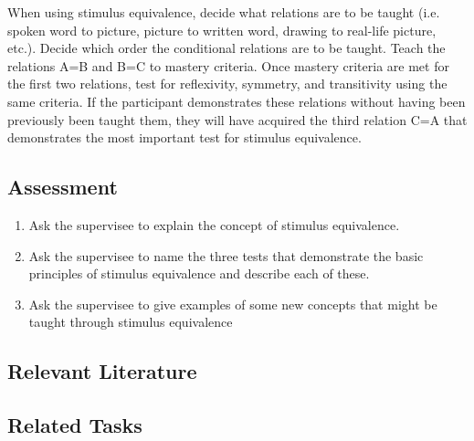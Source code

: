 When using stimulus equivalence, decide what relations are to be taught (i.e. spoken word to picture, picture to written word, drawing to real-life picture, etc.).  Decide which order the conditional relations are to be taught.  Teach the relations A=B and B=C to mastery criteria.  Once mastery criteria are met for the first two relations, test for reflexivity, symmetry, and transitivity using the same criteria.  If the participant demonstrates these relations without having been previously been taught them, they will have acquired the third relation C=A that demonstrates the most important test for stimulus equivalence.   

\subsection{Assessment}
\begin{enumerate}
\item Ask the supervisee to explain the concept of stimulus equivalence.
\item Ask the supervisee to name the three tests that demonstrate the basic principles of stimulus equivalence and describe each of these.
\item Ask the supervisee to give examples of some new concepts that might be taught through stimulus equivalence
\end{enumerate}
%
\subsection{Relevant Literature}
\begin{refsection}
\nocite{test,alang2017police,clayton2018black}
\printbibliography[heading=none]
\end{refsection}
%
\subsection{Related Tasks}
\foureSix{}\\
\foureThirteen{}\\
\fourFKEleven{}\\
\fourFKTwelve{}\\
\fourFKThirteen{}\\
\fourFKTwentyFour{}\\
\fourFKTwentyEight{}\\
\fourFKThirtyFive{}\\
%
%
%
%
